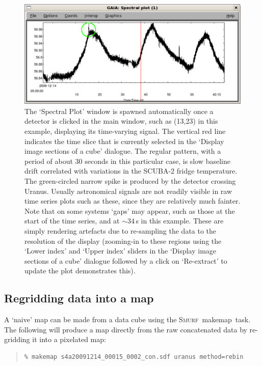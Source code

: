 \documentclass[twoside,11pt]{article}
\newcommand{\xref}[3]{#1}
\newcommand{\xlabel}[1]{}
\renewcommand{\_}{\texttt{\symbol{95}}}
\newenvironment{myquote}{\begin{quote}\begin{small}}{\end{small}\end{quote}}
\newcommand{\smurf}{\xref{\textsc{Smurf}}{sun258}{}}
\newcommand{\task}[1]{\textsf{#1}}
\newcommand{\makemap}{\xref{\task{makemap}}{sun258}{MAKEMAP}}
\begin{document}
\begin{figure}
\begin{center}
\includegraphics[width=0.7\linewidth]{sc19_gaia_spec}
\caption{The `Spectral Plot' window is spawned automatically once a
  detector is clicked in the main window, such as (13,23) in this
  example, displaying its time-varying signal. The vertical red line
  indicates the time slice that is currently selected in the `Display
  image sections of a cube' dialogue. The regular pattern, with a
  period of about 30 seconds in this particular case, is slow baseline
  drift correlated with variations in the SCUBA-2 fridge
  temperature. The green-circled narrow spike is produced by the
  detector crossing Uranus. Usually astronomical signals are not
  readily visible in raw time series plots such as these, since they
  are relatively much fainter. Note that on some systems `gaps' may
  appear, such as those at the start of the time series, and at
  $\sim34$\,s in this example. These are simply rendering artefacts
  due to re-sampling the data to the resolution of the display
  (zooming-in to these regions using the `Lower index' and `Upper
  index' sliders in the `Display image sections of a cube' dialogue
  followed by a click on `Re-extract' to update the plot demonstrates
  this).}
\label{fig:gaia_spec}
\end{center}
\end{figure}

\subsection{\xlabel{regrid_map}Regridding data into a map}

A `naive' map can be made from a data cube using the \smurf\ \makemap\
task. The following will produce a map directly from the raw
concatenated data by re-gridding it into a pixelated map:

\begin{myquote}
\begin{verbatim}
% makemap s4a20091214_00015_0002_con.sdf uranus method=rebin
\end{verbatim}
\end{myquote}
\end{document}
